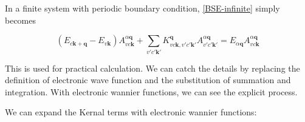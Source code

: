 In a finite system with periodic boundary condition, \cref{BSE-infinite} simply becomes

\begin{equation}\label{BSE-finite}
  (E_{c\boldsymbol{k} + \boldsymbol{q}} - E_{v\boldsymbol{k}}) A_{vc\boldsymbol{k}}^{\alpha\boldsymbol{q}} 
  + \sum_{v'c'\boldsymbol{k}'} K_{vc\boldsymbol{k},v'c'\boldsymbol{k}'}^{\boldsymbol{q}}
    A_{v'c'\boldsymbol{k}'}^{\alpha\boldsymbol{q}}
  = E_{\alpha \boldsymbol{q}} A_{vc\boldsymbol{k}}^{\alpha\boldsymbol{q}} 
\end{equation}

\noindent
This is used for practical calculation. 
We can catch the details by replacing the definition of electronic wave function and the substitution of summation and integration.
With electronic wannier functions, we can see the explicit process.


We can expand the Kernal terms with electronic wannier functions:

